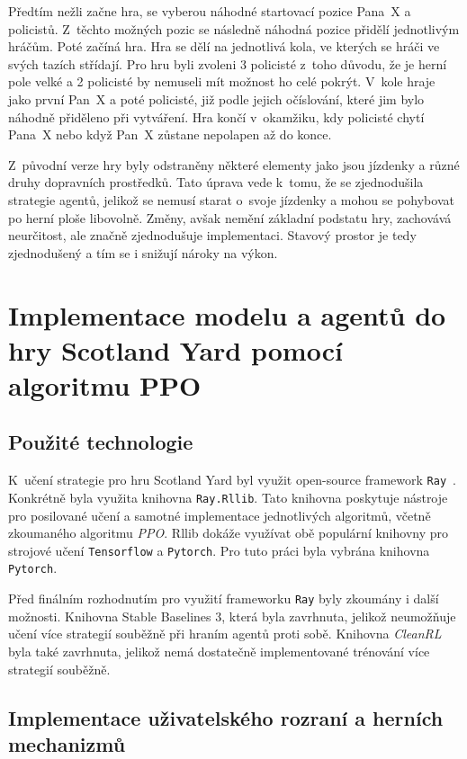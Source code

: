 Předtím nežli začne hra, se vyberou náhodné startovací pozice Pana~X a policistů.
Z~těchto možných pozic se následně náhodná pozice přidělí jednotlivým hráčům.
Poté začíná hra.
Hra se dělí na jednotlivá kola, ve kterých se hráči ve svých tazích střídají.
Pro hru byli zvoleni 3 policisté z~toho důvodu, že je herní pole velké a 2 policisté by nemuseli mít možnost ho celé pokrýt.
V~kole hraje jako první Pan~X a poté policisté, již podle jejich očíslování, které jim bylo náhodně přiděleno při vytváření.
Hra končí v~okamžiku, kdy policisté chytí Pana~X nebo když Pan~X zůstane nepolapen až do konce.

Z~původní verze hry byly odstraněny některé elementy jako jsou jízdenky a různé druhy dopravních prostředků.
Tato úprava vede k~tomu, že se zjednodušila strategie agentů, jelikož se nemusí starat o~svoje jízdenky a mohou se pohybovat po herní ploše libovolně.
Změny, avšak nemění základní podstatu hry, zachovává neurčitost, ale značně zjednodušuje implementaci.
Stavový prostor je tedy zjednodušený a tím se i snižují nároky na výkon.

\section{Implementace modelu a agentů do hry Scotland Yard pomocí algoritmu PPO}
\label{sec:implementace}

\subsection{Použité technologie}\label{subsec:pouzite-technologie}
K~učení strategie pro hru Scotland Yard byl využit open-source framework \texttt{Ray}~\cite{Ray}.
Konkrétně byla využita knihovna \texttt{Ray.Rllib}.
Tato knihovna poskytuje nástroje pro posilované učení a samotné implementace jednotlivých algoritmů, včetně zkoumaného algoritmu \emph{PPO}.
Rllib dokáže využívat obě populární knihovny pro strojové učení \texttt{Tensorflow} a \texttt{Pytorch}.
Pro tuto práci byla vybrána knihovna \texttt{Pytorch}.

Před finálním rozhodnutím pro využití frameworku \texttt{Ray} byly zkoumány i další možnosti.
Knihovna Stable Baselines 3, která byla zavrhnuta, jelikož neumožňuje učení více strategií souběžně při hraním agentů proti sobě.
Knihovna \textit{CleanRL} byla také zavrhnuta, jelikož nemá dostatečně implementované trénování více strategií souběžně.

\subsection{Implementace uživatelského rozraní a herních mechanizmů}\label{subsec:implementace-uzivatelskeho-rozrani-a-hernich-mechanizmu}

